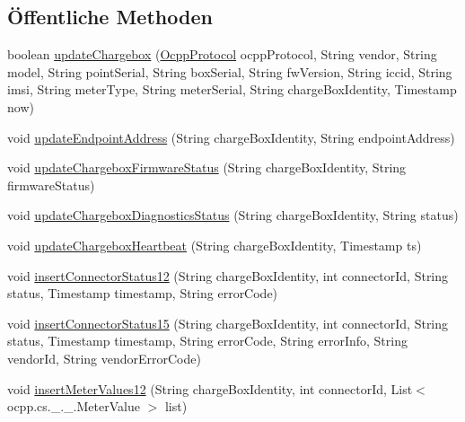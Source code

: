 \subsection*{Öffentliche Methoden}
\begin{DoxyCompactItemize}
\item 
boolean \hyperlink{interfacede_1_1rwth_1_1idsg_1_1steve_1_1repository_1_1_ocpp_server_repository_aa8aa3340bec58017d0a9b18a5040ca3d}{update\-Chargebox} (\hyperlink{enumde_1_1rwth_1_1idsg_1_1steve_1_1ocpp_1_1_ocpp_protocol}{Ocpp\-Protocol} ocpp\-Protocol, String vendor, String model, String point\-Serial, String box\-Serial, String fw\-Version, String iccid, String imsi, String meter\-Type, String meter\-Serial, String charge\-Box\-Identity, Timestamp now)
\item 
void \hyperlink{interfacede_1_1rwth_1_1idsg_1_1steve_1_1repository_1_1_ocpp_server_repository_abf41cab95009f461986a611f43e3f226}{update\-Endpoint\-Address} (String charge\-Box\-Identity, String endpoint\-Address)
\item 
void \hyperlink{interfacede_1_1rwth_1_1idsg_1_1steve_1_1repository_1_1_ocpp_server_repository_afbd7ab89a03cb005ab824b3ce84fbc30}{update\-Chargebox\-Firmware\-Status} (String charge\-Box\-Identity, String firmware\-Status)
\item 
void \hyperlink{interfacede_1_1rwth_1_1idsg_1_1steve_1_1repository_1_1_ocpp_server_repository_ade86b237d803f260a241497a561a96c0}{update\-Chargebox\-Diagnostics\-Status} (String charge\-Box\-Identity, String status)
\item 
void \hyperlink{interfacede_1_1rwth_1_1idsg_1_1steve_1_1repository_1_1_ocpp_server_repository_ad2282a0ee31ed53827d9fe2c2601e208}{update\-Chargebox\-Heartbeat} (String charge\-Box\-Identity, Timestamp ts)
\item 
void \hyperlink{interfacede_1_1rwth_1_1idsg_1_1steve_1_1repository_1_1_ocpp_server_repository_adb143c82a65a1fafd1084b1330cd899c}{insert\-Connector\-Status12} (String charge\-Box\-Identity, int connector\-Id, String status, Timestamp timestamp, String error\-Code)
\item 
void \hyperlink{interfacede_1_1rwth_1_1idsg_1_1steve_1_1repository_1_1_ocpp_server_repository_a5eed2253ddcd7b8d2b263805e96780be}{insert\-Connector\-Status15} (String charge\-Box\-Identity, int connector\-Id, String status, Timestamp timestamp, String error\-Code, String error\-Info, String vendor\-Id, String vendor\-Error\-Code)
\item 
void \hyperlink{interfacede_1_1rwth_1_1idsg_1_1steve_1_1repository_1_1_ocpp_server_repository_afb15fceb9f5da8204816ad7cbc53bedc}{insert\-Meter\-Values12} (String charge\-Box\-Identity, int connector\-Id, List$<$ ocpp.\-cs.\-\_.\-\_.\-Meter\-Value $>$ list)

\end{DoxyCompactItemize}

